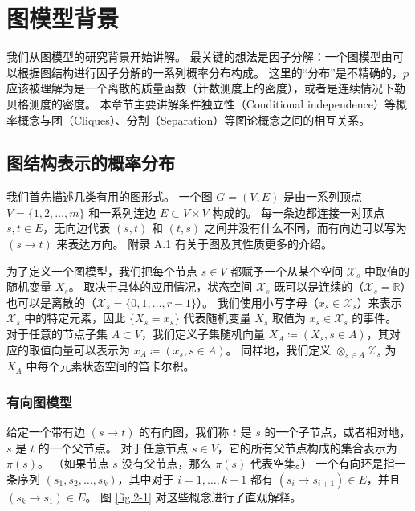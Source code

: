 \chapter{图模型背景}

我们从图模型的研究背景开始讲解。
最关键的想法是因子分解：一个图模型由可以根据图结构进行因子分解的一系列概率分布构成。
这里的“分布”是不精确的，$p$ 应该被理解为是一个离散的质量函数（计数测度上的密度），或者是连续情况下勒贝格测度的密度。
本章节主要讲解条件独立性（Conditional independence）等概率概念与团（Cliques）、分割（Separation）等图论概念之间的相互关系。

\section{图结构表示的概率分布}

我们首先描述几类有用的图形式。
一个图 $G = (V, E)$ 是由一系列顶点 $V = \{1, 2, \dots, m\}$ 和一系列连边 $E \subset V \times V$ 构成的。
每一条边都连接一对顶点 $s, t \in E$，无向边代表 $(s, t)$ 和 $(t, s)$ 之间并没有什么不同，而有向边可以写为 $(s \rightarrow t)$ 来表达方向。
附录 A.1 有关于图及其性质更多的介绍。

为了定义一个图模型，我们把每个节点 $s \in V$ 都赋予一个从某个空间 $\mathcal{X}_s$ 中取值的随机变量 $X_s$。
取决于具体的应用情况，状态空间 $\mathcal{X}_s$ 既可以是连续的（$\mathcal{X}_s = \mathbb{R}$）也可以是离散的（$\mathcal{X}_s = \{0, 1, \dots, r-1\}$）。
我们使用小写字母（$x_s \in \mathcal{X}_s$）来表示 $\mathcal{X}_s$ 中的特定元素，因此 $\{X_s = x_s\}$ 代表随机变量 $X_s$ 取值为 $x_s \in \mathcal{X}_s$ 的事件。
对于任意的节点子集 $A \subset V$，我们定义子集随机向量 $X_A \coloneqq (X_s, s \in A)$，其对应的取值向量可以表示为 $x_A \coloneqq (x_s, s \in A)$。
同样地，我们定义 $\otimes_{s \in A}\mathcal{X}_s$ 为 $X_A$ 中每个元素状态空间的笛卡尔积。

\subsection{有向图模型}

给定一个带有边 $(s \rightarrow t)$ 的有向图，我们称 $t$ 是 $s$ 的一个子节点，或者相对地，$s$ 是 $t$ 的一个父节点。
对于任意节点 $s \in V$，它的所有父节点构成的集合表示为 $\pi(s)$。
（如果节点 $s$ 没有父节点，那么 $\pi(s)$ 代表空集。）
一个有向环是指一条序列 $(s_1, s_2, \dots, s_k)$，其中对于 $i = 1, \dots, k-1$ 都有 $(s_i \rightarrow s_{i+1}) \in E$，并且 $(s_k \rightarrow s_1) \in E$。
图 \ref{fig:2-1} 对这些概念进行了直观解释。

